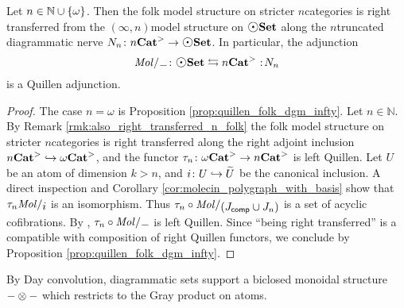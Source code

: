 \begin{thm}\label{thm:quillen_folk_dgm_n}
    Let \( n \in \mathbb{N} \cup \left\{ {\omega} \right\} \).
    Then the folk model structure on stricter \( n \)\nbd categories is right transferred from the \( (\infty, n) \)\nbd model structure on \( \dgmSet \) along the \( n \)\nbd truncated diagrammatic nerve \( \N{n} \colon \snCat{n} \to \dgmSet \).
    In particular, the adjunction 
    \begin{equation*}
        \molecin{-} \colon \dgmSet \leftrightarrows \snCat{n} \cocolon \N{n}
    \end{equation*}
    is a Quillen adjunction.
\end{thm}
\begin{proof}
    The case \( n = \omega \) is Proposition \ref{prop:quillen_folk_dgm_infty}.
    Let \( n \in \mathbb{N} \).
    By Remark \ref{rmk:also_right_transferred_n_folk} the folk model structure on stricter \( n \)\nbd categories is right transferred along the right adjoint inclusion \( {n\mathbf{Cat}}^> \hookrightarrow {\omega\mathbf{Cat}}^> \), and the functor \( \tau_{n} \colon {\omega\mathbf{Cat}}^> \to {n\mathbf{Cat}}^> \) is left Quillen.
    Let \( U \) be an atom of dimension \( k > n \), and \( i \colon U \hookrightarrow \widetilde{U} \) be the canonical inclusion.
    A direct inspection and Corollary \ref{cor:molecin_polygraph_with_basis} show that \( \trunc{n}\molecin{i} \) is an isomorphism.
    Thus \( \trunc{n} \after \molecin{(\Jcomp \cup \Jn{n})} \) is a set of acyclic cofibrations.
    By \cite[E.2.14]{joyal2008theory}, \( \trunc{n} \after \molecin{-} \) is left Quillen. 
    Since ``being right transferred'' is a compatible with composition of right Quillen functors, we conclude by Proposition \ref{prop:quillen_folk_dgm_infty}.
\end{proof}

\noindent By Day convolution, diagrammatic sets support a biclosed monoidal structure \( - \otimes - \) which restricts to the Gray product on atoms.

